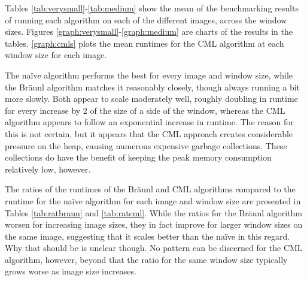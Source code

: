 Tables \ref{tab:verysmall}-\ref{tab:medium} show the mean of the benchmarking results of running each algorithm on each of the different images, across the window sizes.  Figures \ref{graph:verysmall}-\ref{graph:medium} are charts of the results in the tables.  \autoref{graph:cmls} plots the mean runtimes for the CML algorithm at each window size for each image. 

The na\"{i}ve algorithm performs the best for every image and window size, while the Bräunl algorithm matches it reasonably closely, though always running a bit more slowly.  Both appear to scale moderately well, roughly doubling in runtime for every increase by 2 of the size of a side of the window, whereas the CML algorithm appears to follow an exponential increase in runtime.  The reason for this is not certain, but it appears that the CML approach creates considerable pressure on the heap, causing numerous expensive garbage collections.  These collections do have the benefit of keeping the peak memory consumption relatively low, however.  %



The ratios of the runtimes of the Bräunl and CML algorithms compared to the runtime for the naïve algorithm for each image and window size are presented in Tables \ref{tab:ratbraun} and \ref{tab:ratcml}.  While the ratios for the Bräunl algorithm worsen for increasing image sizes, they in fact improve for larger window sizes on the same image, suggesting that it scales better than the naïve in this regard.  Why that should be is unclear though.  No pattern can be discerned for the CML algorithm, however, beyond that the ratio for the same window size typically grows worse as image size increases. 

